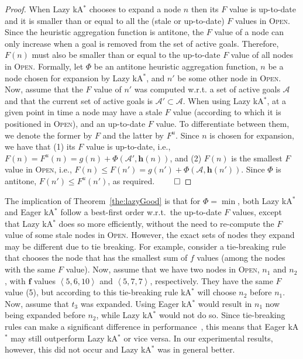 \documentclass[smallextended]{svjour3}       %
\newcommand{\kastar}{kA$^*$\xspace}
\newcommand{\tuple}[1]{\ensuremath{\left \langle #1 \right \rangle }}
\newcommand{\open}{\textsc{Open}\xspace}
\newcommand{\activeg}{\mathcal{A}}
\newcommand{\vect}[1]{\mathbf{#1}}
\newcommand{\roni}[1]{\textbf{[RS:#1]}}
\begin{document}
\begin{proof}
When Lazy \kastar chooses to expand a node $n$ then its $F$ value is up-to-date and it is smaller than or equal to all the (stale or up-to-date) $F$ values in \open. Since the heuristic aggregation function is antitone, the $F$ value of a node can only increase when a goal is removed from the set of active goals. 
Therefore, $F(n)$ must also be smaller than or equal to the up-to-date $F$ value of all nodes in \open. 
Formally, let $\Phi$ be an antitone heuristic aggregation function, $n$ be a node chosen for expansion by Lazy \kastar, and $n'$ be some other node in \open. 
Now, assume that the $F$ value of $n'$ was computed w.r.t. a set of active goals $\activeg$ and that the current set of active goals is $\activeg'\subset \activeg$. When using Lazy \kastar, at a given point in time a node may have a stale $F$ value (according to which it is positioned in \open), and an up-to-date $F$ value. To differentiate between them, we denote the former by $F$ and the latter by $F^u$. Since $n$ is chosen for expansion, we have that (1) its $F$ value is up-to-date, i.e., $F(n)=F^u(n)=g(n)+\Phi(\activeg', \vect{h}(n))$, 
and (2) $F(n)$ is the smallest $F$ value in \open, i.e., $F(n)\leq F(n')=g(n')+\Phi(\activeg, \vect{h}(n'))$. Since $\Phi$ is antitone, $F(n')\leq F^u(n')$, as required.
$\qed$
\end{proof}


The implication of Theorem~\ref{the:lazyGood} is that for $\Phi=\min$, both Lazy \kastar and Eager \kastar follow a  best-first order w.r.t.~the up-to-date $F$ values, except that Lazy \kastar does so more efficiently, without the need to re-compute the $F$ value of some stale nodes in \open.
However, the exact sets of nodes they expand may be different due to tie breaking.
For example, consider a tie-breaking rule that chooses the node that has the smallest sum of $f$ values (among the nodes with the same $F$ value).
Now, assume that we have two nodes in \open, $n_1$ and $n_2$, with $\mathbf{f}$ values $\tuple{5, 6, 10 }$ and $\tuple{5, 7, 7}$, respectively.
They have the same $F$ value (5), but according to this tie-breaking rule \kastar will choose $n_2$ before $n_1$.
Now, assume that $t_3$ was expanded.
Using Eager \kastar would result in $n_1$ now being expanded before $n_2$, while Lazy \kastar would not do so.
Since tie-breaking rules can make a significant difference in performance~\cite{asai2017tieBreaking}, this means that Eager \kastar may still outperform Lazy \kastar or vice versa. 
In our experimental results, however, this did not occur and Lazy \kastar was in general better. %
\end{document}

